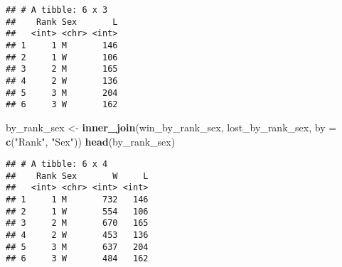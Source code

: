 \documentclass[]{article}
\newenvironment{Shaded}{\begin{snugshade}}{\end{snugshade}}
\newcommand{\CommentTok}[1]{\textcolor[rgb]{0.56,0.35,0.01}{\textit{#1}}}
\newcommand{\DataTypeTok}[1]{\textcolor[rgb]{0.13,0.29,0.53}{#1}}
\newcommand{\DecValTok}[1]{\textcolor[rgb]{0.00,0.00,0.81}{#1}}
\newcommand{\KeywordTok}[1]{\textcolor[rgb]{0.13,0.29,0.53}{\textbf{#1}}}
\newcommand{\NormalTok}[1]{#1}
\newcommand{\OperatorTok}[1]{\textcolor[rgb]{0.81,0.36,0.00}{\textbf{#1}}}
\newcommand{\StringTok}[1]{\textcolor[rgb]{0.31,0.60,0.02}{#1}}
\begin{document}
\begin{Shaded}
\end{Shaded}

\begin{verbatim}
## # A tibble: 6 x 3
##    Rank Sex       L
##   <int> <chr> <int>
## 1     1 M       146
## 2     1 W       106
## 3     2 M       165
## 4     2 W       136
## 5     3 M       204
## 6     3 W       162
\end{verbatim}

\begin{Shaded}
\begin{Highlighting}[]
\NormalTok{by_rank_sex <-}\StringTok{ }\KeywordTok{inner_join}\NormalTok{(win_by_rank_sex, lost_by_rank_sex, }\DataTypeTok{by =} \KeywordTok{c}\NormalTok{(}\StringTok{"Rank"}\NormalTok{, }\StringTok{"Sex"}\NormalTok{))}
\KeywordTok{head}\NormalTok{(by_rank_sex)}
\end{Highlighting}
\end{Shaded}

\begin{verbatim}
## # A tibble: 6 x 4
##    Rank Sex       W     L
##   <int> <chr> <int> <int>
## 1     1 M       732   146
## 2     1 W       554   106
## 3     2 M       670   165
## 4     2 W       453   136
## 5     3 M       637   204
## 6     3 W       484   162
\end{verbatim}

\begin{Shaded}
\end{Shaded}
\end{document}
